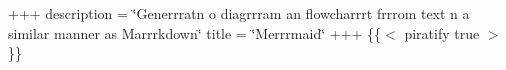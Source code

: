 +++ description = \char`\"{}\+Generrrat\textquotesingle{}n o\textquotesingle{} diagrrram an\textquotesingle{} flowcharrrt frrrom text \textquotesingle{}n a similar manner as Marrrkdown\char`\"{} title = \char`\"{}\+Merrrmaid\char`\"{} +++ \{\{$<$ piratify true $>$\}\} 